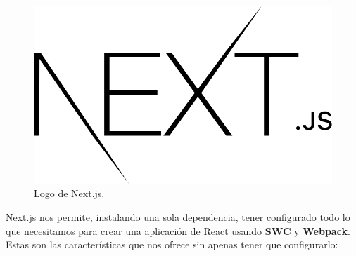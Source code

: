 \documentclass[12pt,twoside,titlepage]{report}
\begin{document}
\begin{figure}[H]
    \centering
    \includegraphics[scale=0.14]{Nextjs/Nextjs}
    \caption{Logo de Next.js.}
    \label{fig:NextjsLogo}
\end{figure}

Next.js nos permite, instalando una sola dependencia, tener configurado todo lo que necesitamos para crear una aplicación de React usando \textbf{SWC} y \textbf{Webpack}. Estas son las características que nos ofrece sin apenas tener que configurarlo:
\end{document}
